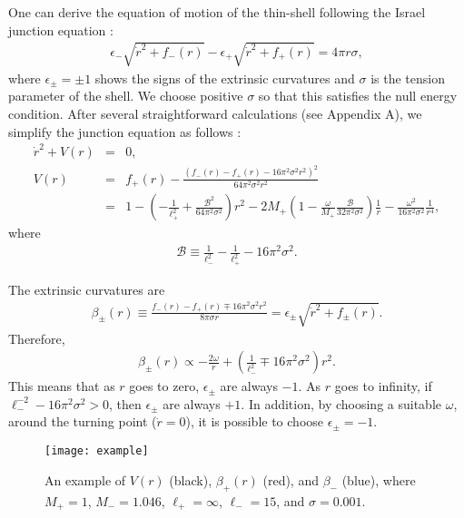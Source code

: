 \documentclass[preprintnumbers,10pt,nofootinbib]{revtex4}
\begin{document}
One can derive the equation of motion of the thin-shell following the Israel junction equation \cite{Israel:1966rt}:
\begin{eqnarray}\label{eq:junc}
\epsilon_{-} \sqrt{\dot{r}^{2}+f_{-}(r)} - \epsilon_{+} \sqrt{\dot{r}^{2}+f_{+}(r)} = 4\pi r \sigma,
\end{eqnarray}
where $\epsilon_{\pm} = \pm 1$ shows the signs of the extrinsic curvatures and $\sigma$ is the tension parameter of the shell. We choose positive $\sigma$ so that this satisfies the null energy condition. After several straightforward calculations (see Appendix A), we simplify the junction equation as follows \cite{Blau:1986cw}:
\begin{eqnarray}\label{eq:form}
\dot{r}^{2} + V(r) &=& 0,\\\label{eq:form2}
V(r) &=& f_{+}(r)- \frac{\left(f_{-}(r)-f_{+}(r)-16\pi^{2} \sigma^{2} r^{2}\right)^{2}}{64 \pi^{2} \sigma^{2} r^{2}}\\
&=& 1 - \left(-\frac{1}{\ell_{+}^{2}} + \frac{\mathcal{B}^{2}}{64 \pi^{2} \sigma^{2}}\right) r^{2} - 2M_{+}\left( 1 - \frac{\omega}{M_{+}} \frac{\mathcal{B}}{32 \pi^{2} \sigma^{2}} \right) \frac{1}{r}  - \frac{\omega^{2}}{16 \pi^{2} \sigma^{2}} \frac{1}{r^{4}},
\end{eqnarray}
where
\begin{eqnarray}
\mathcal{B} \equiv \frac{1}{\ell_{-}^{2}} - \frac{1}{\ell_{+}^{2}} - 16 \pi^{2} \sigma^{2}.
\end{eqnarray}

The extrinsic curvatures are \cite{Blau:1986cw}
\begin{eqnarray}
\beta_{\pm}(r) \equiv \frac{f_{-}(r)-f_{+}(r)\mp 16\pi^{2} \sigma^{2} r^{2}}{8 \pi \sigma r} = \epsilon_{\pm} \sqrt{\dot{r}^{2}+f_{\pm}(r)}.
\end{eqnarray}
Therefore,
\begin{eqnarray}\label{eq:beta}
\beta_{\pm}(r) \propto - \frac{2 \omega}{r} + \left(\frac{1}{\ell_{-}^{2}} \mp 16 \pi^{2} \sigma^{2}\right) r^{2}.
\end{eqnarray}
This means that as $r$ goes to zero, $\epsilon_{\pm}$ are always $-1$. As $r$ goes to infinity, if $\ell_{-}^{-2} - 16\pi^{2} \sigma^{2} > 0$, then $\epsilon_{\pm}$ are always $+1$. In addition, by choosing a suitable $\omega$, around the turning point ($\dot{r} = 0$), it is possible to choose $\epsilon_{\pm} = -1$.

\begin{figure}
\begin{center}
\texttt{[image: example]}
\caption{\label{fig:example}An example of $V(r)$ (black), $\beta_{+}(r)$ (red), and $\beta_{-}$ (blue), where $M_{+} = 1$, $M_{-} = 1.046$, $\ell_{+} = \infty$, $\ell_{-} = 15$, and $\sigma = 0.001$.}
\end{center}
\end{figure}
\end{document}

